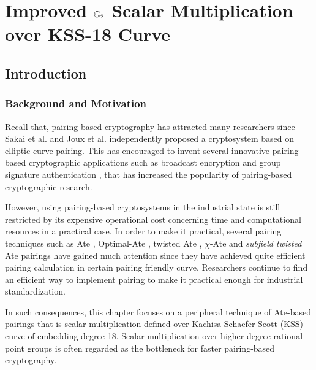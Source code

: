 \chapter{Improved \texorpdfstring{${\mathbb{G}}_{2}$}{G2} Scalar Multiplication over KSS-18 Curve} 
\label{Chapter_IEICE}
\section{Introduction}
\subsection{Background and Motivation}
Recall that, pairing-based cryptography has attracted many researchers since Sakai et al. \cite{EPRINT:SakKas03} and Joux et al. \cite{JC:Joux04} independently proposed a cryptosystem based on elliptic curve pairing. This has encouraged to invent several innovative pairing-based cryptographic applications such as broadcast encryption \cite{C:BonGenWat05} and group signature authentication \cite{C:BonBoySha04}, that has increased the popularity of pairing-based cryptographic research.

However, using pairing-based cryptosystems in the industrial state is still restricted by its expensive operational cost concerning time and computational resources in a practical case. 
In order to make it practical, several pairing techniques such as Ate \cite{DBLP:reference/crc/2005ehcc}, Optimal-Ate \cite{DBLP:journals/tit/Vercauteren10}, twisted Ate \cite{EPRINT:MKHO07}, $\chi$-Ate \cite{PAIRING:NASKM08} and \textit{subfield twisted} Ate \cite{PAIRING:DevScoDah07} pairings have gained much attention since they have achieved quite efficient pairing calculation in certain pairing friendly curve. 
Researchers continue to find an efficient way to implement pairing to make it practical enough for industrial standardization. 

In such consequences, this chapter focuses on a peripheral technique of Ate-based pairings that is scalar multiplication defined over Kachisa-Schaefer-Scott (KSS) curve \cite{EPRINT:KacSchSco07} of embedding degree 18. 
Scalar multiplication over higher degree rational point groups is often regarded as the bottleneck for faster pairing-based cryptography.

